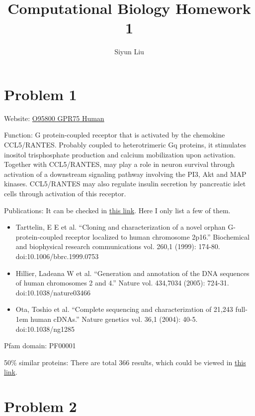 \documentclass{article}
\title{Computational Biology Homework 1}
\author{Siyun Liu}
\date{}
\begin{document}
\maketitle

\section{Problem 1}

Website: \href{https://www.uniprot.org/uniprotkb/O95800/entry}{O95800 GPR75 Human}

Function: G protein-coupled receptor that is activated by the chemokine CCL5/RANTES. Probably coupled to heterotrimeric Gq proteins, it stimulates inositol trisphosphate production and calcium mobilization upon activation. Together with CCL5/RANTES, may play a role in neuron survival through activation of a downstream signaling pathway involving the PI3, Akt and MAP kinases. CCL5/RANTES may also regulate insulin secretion by pancreatic islet cells through activation of this receptor.

Publications: It can be checked in \href{https://www.uniprot.org/uniprotkb/O95800/publications}{this link}. Here I only list a few of them.

\begin{itemize}
    \item Tarttelin, E E et al. “Cloning and characterization of a novel orphan G-protein-coupled receptor localized to human chromosome 2p16.” Biochemical and biophysical research communications vol. 260,1 (1999): 174-80. doi:10.1006/bbrc.1999.0753
    \item Hillier, Ladeana W et al. “Generation and annotation of the DNA sequences of human chromosomes 2 and 4.” Nature vol. 434,7034 (2005): 724-31. doi:10.1038/nature03466
    \item Ota, Toshio et al. “Complete sequencing and characterization of 21,243 full-1em human cDNAs.” Nature genetics vol. 36,1 (2004): 40-5. doi:10.1038/ng1285
\end{itemize}

Pfam domain: PF00001

50\% similar proteins: There are total 366 results, which could be viewed in \href{https://www.uniprot.org/uniprotkb?query=(uniref_cluster_50:UniRef50_Q6X632)+NOT+(accession:O95800)}{this link}.

\section{Problem 2}
\end{document}
